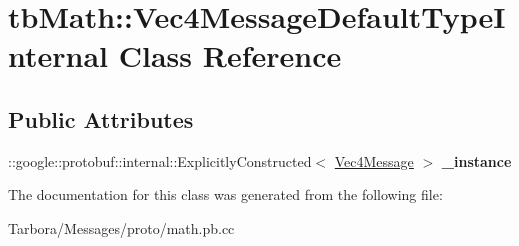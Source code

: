 \hypertarget{classtbMath_1_1Vec4MessageDefaultTypeInternal}{}\section{tb\+Math\+:\+:Vec4\+Message\+Default\+Type\+Internal Class Reference}
\label{classtbMath_1_1Vec4MessageDefaultTypeInternal}
\subsection*{Public Attributes}
\begin{DoxyCompactItemize}
\item 
\mbox{\label{classtbMath_1_1Vec4MessageDefaultTypeInternal_a3cea90e5c5c89c9ee3da0b54b21ec66f}} 
\+::google\+::protobuf\+::internal\+::\+Explicitly\+Constructed$<$ \hyperlink{classtbMath_1_1Vec4Message}{Vec4\+Message} $>$ {\bfseries \+\_\+instance}
\end{DoxyCompactItemize}


The documentation for this class was generated from the following file\+:\begin{DoxyCompactItemize}
\item 
Tarbora/\+Messages/proto/math.\+pb.\+cc\end{DoxyCompactItemize}
